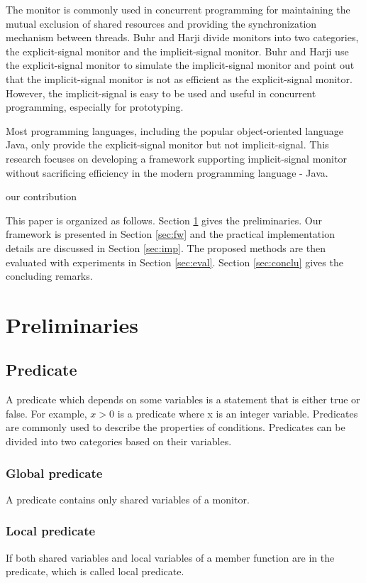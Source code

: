 \documentclass[preprint]{sigplanconf}
\begin{document}
The monitor \cite{hoa74} is commonly used in concurrent programming for 
maintaining the mutual exclusion of shared resources and providing the 
synchronization mechanism between threads. Buhr and Harji \cite{bh05} divide 
monitors into two categories, the explicit-signal monitor and the 
implicit-signal monitor. Buhr and Harji use the explicit-signal monitor to 
simulate the implicit-signal monitor and point out that the implicit-signal 
monitor is not as efficient as the explicit-signal monitor. However, the 
implicit-signal is easy to be used and useful in concurrent programming,
especially for prototyping. 


Most programming languages, including the popular object-oriented language Java,
only provide the explicit-signal monitor but not implicit-signal. This research 
focuses on developing a framework supporting implicit-signal monitor without
sacrificing efficiency in the modern programming language - Java. 

our contribution

This paper is organized as follows. Section \ref{sec:pre} gives the
preliminaries. 
Our framework is presented in Section \ref{sec:fw} and the practical 
implementation details are discussed in Section \ref{sec:imp}. The proposed 
methods are then evaluated with experiments in Section \ref{sec:eval}. 
Section \ref{sec:conclu} gives the concluding remarks.

\section{Preliminaries} \label{sec:pre}
\subsection{Predicate}
A predicate which depends on some variables is a statement that is either true
or false. For example, $x > 0$ is a predicate where x is an integer variable. 
Predicates are commonly used to describe the properties of conditions. 
Predicates can be divided into two categories based on their variables.
\subsubsection{Global predicate} A predicate contains only shared variables of a
    monitor. 
\subsubsection{Local predicate} If both shared variables and local variables of a
    member function are in the predicate, which is called local predicate. 
\end{document}
